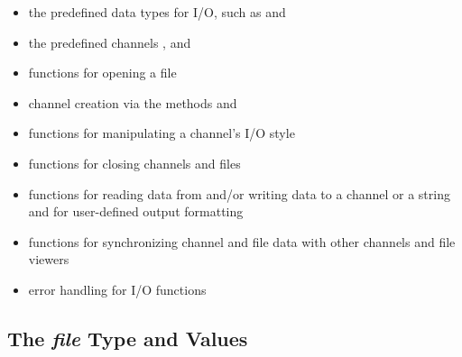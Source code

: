 \begin{itemize}

\item the predefined data types for I/O, such as  and 

\item the predefined channels ,  and 

\item functions for opening a file

\item channel creation via the methods  and 

\item functions for manipulating a channel's I/O style

\item functions for closing channels and files

\item functions for reading data from and/or writing data to a channel
      or a string and for user-defined output formatting

\item functions for synchronizing channel and file data
      with other channels and file viewers

\item error handling for I/O functions

\end{itemize}





\subsection{The {\em file} Type and Values}
\label{IO_file_type}


